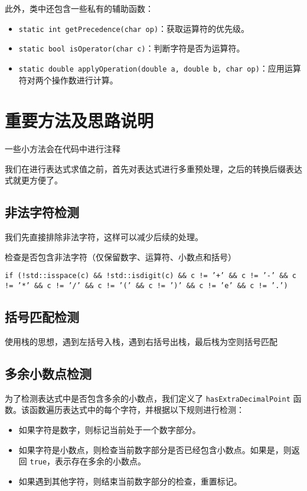 \documentclass[UTF8]{ctexart}
\begin{document}
此外，类中还包含一些私有的辅助函数：

\begin{itemize}
  \item \texttt{static int getPrecedence(char op)}：获取运算符的优先级。
  \item \texttt{static bool isOperator(char c)}：判断字符是否为运算符。
  \item \texttt{static double applyOperation(double a, double b, char op)}：应用运算符对两个操作数进行计算。
\end{itemize}

\section{重要方法及思路说明}

一些小方法会在代码中进行注释

我们在进行表达式求值之前，首先对表达式进行多重预处理，之后的转换后缀表达式就更方便了。

\subsection{非法字符检测}

我们先直接排除非法字符，这样可以减少后续的处理。

检查是否包含非法字符（仅保留数字、运算符、小数点和括号）

\texttt{if (!std::isspace(c) \&\& !std::isdigit(c) \&\& c != '+' \&\& c != '-' \&\& c != '*' \&\& c != '/' \&\& c != '(' \&\& c != ')' \&\& c != 'e' \&\& c != '.')}

\subsection{括号匹配检测}

使用栈的思想，遇到左括号入栈，遇到右括号出栈，最后栈为空则括号匹配

\subsection{多余小数点检测}

为了检测表达式中是否包含多余的小数点，我们定义了 \texttt{hasExtraDecimalPoint} 函数。该函数遍历表达式中的每个字符，并根据以下规则进行检测：

\begin{itemize}
  \item 如果字符是数字，则标记当前处于一个数字部分。
  \item 如果字符是小数点，则检查当前数字部分是否已经包含小数点。如果是，则返回 \texttt{true}，表示存在多余的小数点。
  \item 如果遇到其他字符，则结束当前数字部分的检查，重置标记。
\end{itemize}
\end{document}
